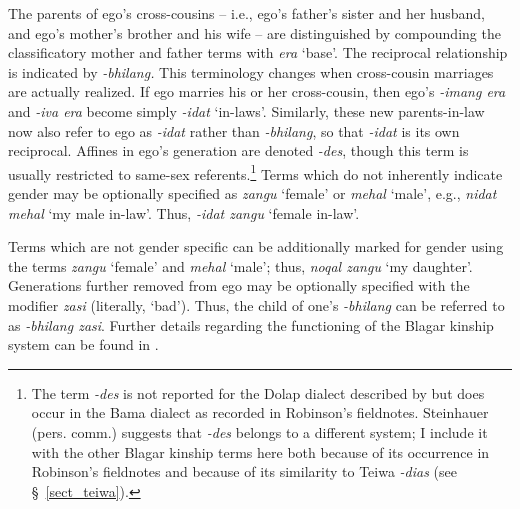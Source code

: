 The parents of ego's cross-cousins -- i.e., ego's father's sister and her husband, and ego's mother's brother and his wife -- are distinguished by compounding the classificatory mother and father terms with \textit{era} `base'. The reciprocal relationship is indicated by \textit{-bhilang.} This terminology changes when cross-cousin marriages are actually realized. If ego marries his or her cross-cousin, then ego's \textit{-imang era} and \textit{-iva era} become simply \textit{-idat} `in-laws'. Similarly, these new parents-in-law now also refer to ego as \textit{-idat} rather than \textit{-bhilang}, so that \textit{-idat} is its own reciprocal. Affines in ego's generation are denoted \textit{-des}, though this term is usually restricted to same-sex referents.\footnote{The term \textit{-des} is not reported for the Dolap dialect described by \citet{Steinhauer1993} but does occur in the Bama dialect as recorded in Robinson's fieldnotes. Steinhauer (pers. comm.) suggests that \textit{-des} belongs to a different system; I include it with the other Blagar kinship terms here both because of its occurrence in Robinson's fieldnotes and because of its similarity to Teiwa \textit{-dias} (see {\S}~\ref{sect_teiwa}).} Terms which do not inherently indicate gender may be optionally specified as \textit{zangu} `female' or \textit{mehal} `male', e.g., \textit{nidat mehal} `my male in-law'. Thus, \textit{-idat zangu} `female in-law'. 


Terms which are not gender specific can be additionally marked for gender using the terms \textit{zangu} `female' and \textit{mehal} `male'; thus, \textit{noqal zangu} `my daughter'. Generations further removed from ego may be optionally specified with the modifier \textit{zasi} (literally, `bad'). Thus, the child of one's \textit{-bhilang} can be referred to as \textit{-bhilang zasi}. Further details regarding the functioning of the Blagar kinship system can be found in \citet{Steinhauer1993}.



